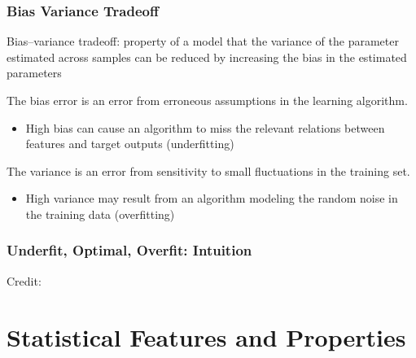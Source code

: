 \documentclass{beamer}
\newenvironment{wideitemize}{\itemize\addtolength{\itemsep}{10pt}}{\enditemize}
\begin{document}
  
  
  \begin{frame}
    \frametitle{Bias Variance Tradeoff}

    \begin{wideitemize}
    \item Bias–variance tradeoff: property of a model that the variance of the parameter estimated across samples can be reduced by increasing the bias in the estimated parameters
      
    \item The bias error is an error from erroneous assumptions in the learning algorithm.
      \begin{itemize}
      \item High bias can cause an algorithm to miss the relevant relations between features and target outputs (underfitting)
      \end{itemize}

        
    \item The variance is an error from sensitivity to small fluctuations in the training set.
      \begin{itemize}
      \item High variance may result from an algorithm modeling the random noise in the training data (overfitting)
      \end{itemize}             
    \end{wideitemize}
      
  \end{frame}

  
\begin{frame}
  \frametitle{Underfit, Optimal, Overfit: Intuition}
  \hspace*{15pt}\hbox{\scriptsize Credit:}
\end{frame}

    
\section{Statistical Features and Properties}
\end{document}
